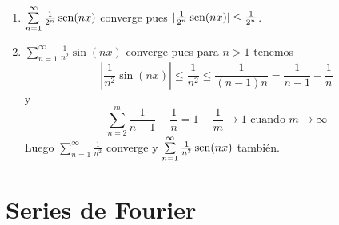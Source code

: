 \begin{ejemplo}
\begin{enumerate}
\item $\sum\limits_{n=1}^{\infty} \frac{1}{2^n} \operatorname{sen}(nx)$ converge pues $|\frac{1}{2^n} \operatorname{sen}(nx)|\leq \frac{1}{2^n}$.
\item $\sum\limits_{n=1}^{\infty} \frac{1}{n^2} \sin(nx)$ converge pues para $n>1$ tenemos
\[
\left|\frac{1}{n^2}\sin(nx)\right|\leq \frac{1}{n^2}\leq \frac{1}{(n-1)n}=\frac{1}{n-1}-\frac{1}{n}
\]
y
\[
\sum\limits_{n=2}^{m}\frac{1}{n-1}-\frac{1}{n}=1-\frac{1}{m}\to 1\mbox{  cuando  } m\to \infty
\]
Luego $\sum\limits_{n=1}^{\infty} \frac{1}{n^2}$ converge y 
$\sum\limits_{n=1}^{\infty} \frac{1}{n^2} \operatorname{sen}(nx)$ también.
\end{enumerate}
\end{ejemplo}
\section{Series de Fourier}